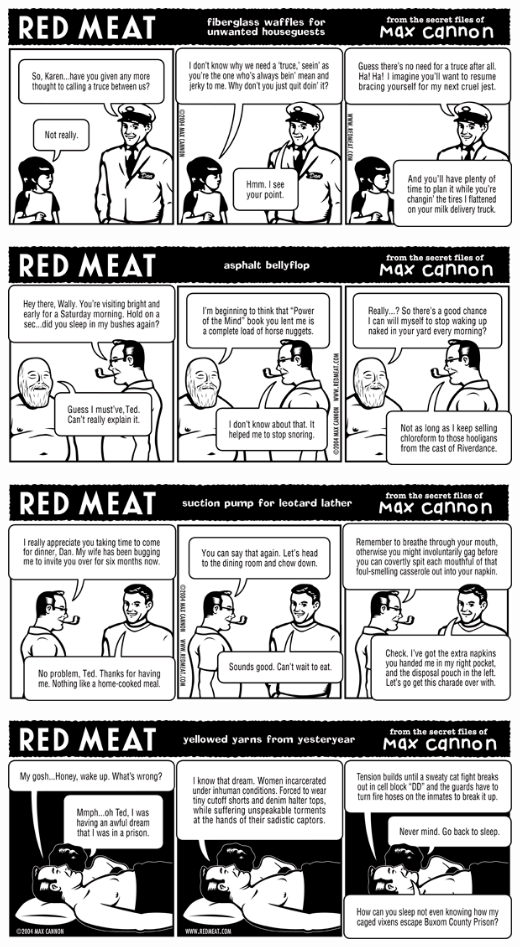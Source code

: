 \documentclass[a4paper,twoside,11pt]{article}
\begin{document}
\includegraphics[width=\textwidth]{redmeat_2004-04-13.png}



\includegraphics[width=\textwidth]{redmeat_2004-04-20.png}



\includegraphics[width=\textwidth]{redmeat_2004-04-27.png}



\includegraphics[width=\textwidth]{redmeat_2004-05-04.png}
\end{document}
